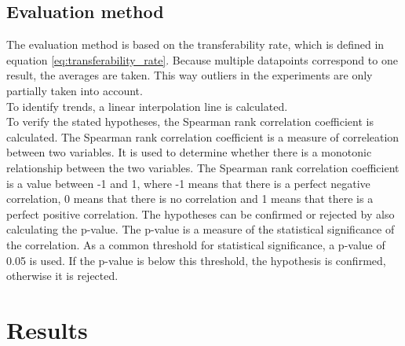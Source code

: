 \documentclass{article}
\begin{document}
\subsection{Evaluation method}
The evaluation method is based on the transferability rate, which is defined in equation \ref{eq:transferability_rate}. Because multiple datapoints correspond to one result, the averages are taken. This way outliers in the experiments are only partially taken into account.\\
To identify trends, a linear interpolation line is calculated. \\
To verify the stated hypotheses, the Spearman rank correlation coefficient is calculated. The Spearman rank correlation coefficient is a measure of correleation between two variables. It is used to determine whether there is a monotonic relationship between the two variables. The Spearman rank correlation coefficient is a value between -1 and 1, where -1 means that there is a perfect negative correlation, 0 means that there is no correlation and 1 means that there is a perfect positive correlation. The hypotheses can be confirmed or rejected by also calculating the p-value. The p-value is a measure of the statistical significance of the correlation. As a common threshold for statistical significance, a p-value of 0.05 is used. If the p-value is below this threshold, the hypothesis is confirmed, otherwise it is rejected. \cite{spearman_rank_correlation}\\

\section{Results}
\end{document}
